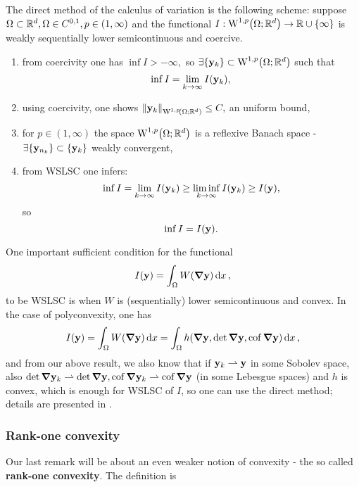 \documentclass[11pt]{scrartcl} %
\begin{document}
\begin{definition}
    The direct method of the calculus of variation is the following scheme: suppose $\Omega \subset {\mathbb R}^{d}, \Omega \in C^{0,1}, p \in \qty(1, \infty)$ and the functional $I: \WkpSet[1][p]{\Omega;\R^{d}} \to \R \cup \qty{\infty}$ is weakly sequentially lower semicontinuous and coercive.
    \begin{enumerate}
	    \item from coercivity one has $\inf I > - \infty,$ so $\exists \qty{\vb{y}_k} \subset \WkpSet[1][p]{\Omega;\R^{d}}$ such that
		    \[
			    \inf I = \lim_{k \to \infty}I\qty(\vb{y}_k),
		    \]
	    \item using coercivity, one shows $\norm{\vb{y}_k}_{\WkpSet[1][p]{\Omega;\R^{d}}} \leq C,$ an uniform bound,
	    \item for $p \in (1, \infty)$ the space $\WkpSet[1][p]{\Omega;\R^{d}}$ is a reflexive Banach space - $\exists \qty{\vb{y}_{n_{k}}} \subset \qty{\vb{y}_k}$ weakly convergent,
	    \item from WSLSC one infers:
		    \[
			    \inf I = \lim_{k \to \infty}I\qty(\vb{y}_k) \geq \liminf_{k \to \infty}I\qty(\vb{y}_k) \geq I\qty(\vb{y}),
		    \]
		    so
		    \[
			    \inf I = I\qty(\vb{y}).
		    \]
    \end{enumerate}
\end{definition}

One important sufficient condition for the functional
\[
	I\qty(\vb{y}) = \int_{\Omega}W\qty(\grad \vb{y})\dd{x},
\]
to be WSLSC is when $W$ is (sequentially) lower semicontinuous and convex. In the case of polyconvexity, one has
\[
	I\qty(\vb{y}) = \int_{\Omega}W\qty(\grad \vb{y})\dd{x} = \int_{\Omega}h\qty(\grad \vb{y}, \det \grad \vb{y}, \operatorname{cof} \grad \vb{y})\dd{x},
\]
and from our above result, we also know that if $\vb{y}_k \rightharpoonup \vb{y}$ in some Sobolev space, also $\det \grad \vb{y}_k \rightharpoonup \det \grad \vb{y}, \operatorname{cof} \grad \vb{y}_k \rightharpoonup \operatorname{cof} \grad \vb{y}$ (in some Lebesgue spaces) and $h$ is convex, which is enough for WSLSC of $I$, so one can use the direct method; details are presented in \cite{kruzikPolyconvexMaterialsExistence2019}.

\subsubsection{Rank-one convexity}
\label{sec:rank_one_convexity}
Our last remark will be about an even weaker notion of convexity - the so called \textbf{rank-one convexity}. The definition is
\end{document}
